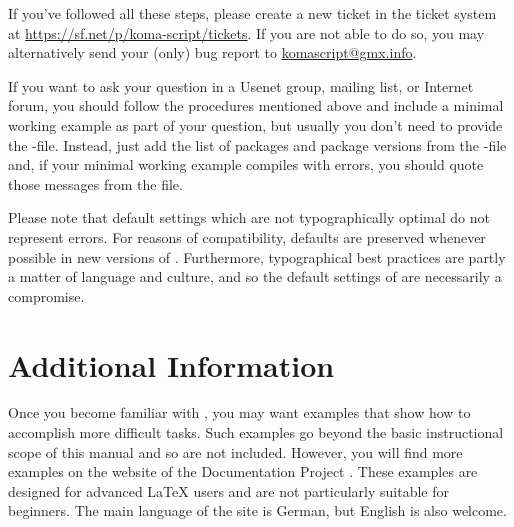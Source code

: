 If you've followed all these steps, please create a new ticket in the
\KOMAScript{} ticket system at \url{https://sf.net/p/koma-script/tickets}. If
you are not able to do so, you may alternatively send your {\KOMAScript}
(only) bug report to \href{mailto:komascript@gmx.info}{komascript@gmx.info}.

If you want to ask your question in a Usenet group, mailing list, or Internet
forum, you should follow the procedures mentioned above and include a minimal
working example as part of your question, but usually you don't need to
provide the -file. Instead, just add the list of packages and
package versions from the -file and, if your minimal working example
compiles with errors, you should quote those messages from the 
file.

Please note that default settings which are not typographically optimal do not
represent errors. For reasons of compatibility, defaults are preserved
whenever possible in new versions of {\KOMAScript}. Furthermore, typographical
best practices are partly a matter of language and culture, and so the default
settings of {\KOMAScript} are necessarily a compromise.

\section{Additional Information}

Once you become familiar with {\KOMAScript}, you may want examples that show
how to accomplish more difficult tasks. Such examples go beyond the basic
instructional scope of this manual and so are not included. However, you will
find more examples on the website of the {\KOMAScript} Documentation Project
\cite{homepage}. These examples are designed for advanced {\LaTeX} users and
are not particularly suitable for beginners. The main language of the site
is German, but English is also welcome.

\endinput
